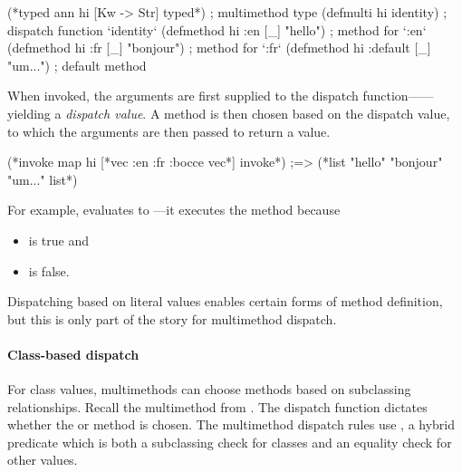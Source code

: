 \begin{exmp}
\begin{cljlisting}
(*typed ann hi [Kw -> Str] typed*) ; multimethod type
(defmulti hi identity) ; dispatch function `identity`
(defmethod hi :en [_] "hello") ; method for `:en`
(defmethod hi :fr [_] "bonjour") ; method for `:fr`
(defmethod hi :default [_] "um...") ; default method
\end{cljlisting}
\label{example:hi-multimethod}
\end{exmp}

When invoked, the arguments are first supplied to the dispatch function------yielding
a \emph{dispatch value}. A method is then chosen
based on the dispatch value, to which the arguments are then passed to return a value.

\begin{cljlisting}
(*invoke map hi [*vec :en :fr :bocce vec*] invoke*) ;=> (*list "hello" "bonjour" "um..." list*)
\end{cljlisting}

For example, 
 evaluates to ---it executes
the  method
because 
\begin{itemize}
  \item {} is true
and 
    \item {} is false.
\end{itemize}

Dispatching based on literal values enables certain forms of method
definition, but this is only part of the story for multimethod dispatch.

\paragraph{Class-based dispatch}
For class values, multimethods can choose methods based on subclassing
relationships.
%
Recall the multimethod from . %
%
The dispatch function 
dictates 
whether the  or  method is chosen.
%
The multimethod dispatch rules use
, a hybrid predicate which is both a subclassing check for classes and
an equality check for other values.

